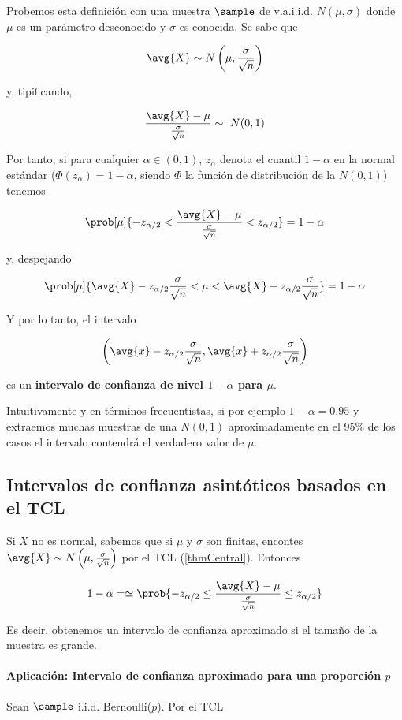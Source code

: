 \documentclass{apuntes}
\begin{document}
Probemos esta definición con una muestra $\sample$ de v.a.i.i.d. $N(\mu,\sigma)$ donde $\mu$ es un parámetro desconocido y $\sigma$ es conocida. Se sabe que

\[ \avg{X} \sim N\left(\mu,\frac{\sigma}{\sqrt{n}}\right) \]

y, tipificando,

\[ \frac{\avg{X}-\mu}{\frac{\sigma}{\sqrt{n}}} \sim~ N(0,1) \]

Por tanto, si para cualquier $\alpha\in(0,1)$, $z_\alpha$ denota el cuantil $1-\alpha$ en la normal estándar ($Φ(z_\alpha) = 1-\alpha$, siendo $Φ$ la función de distribución de la $N(0,1)$) tenemos

\[ \prob[\mu]{-z_{\alpha/2} < \frac{\avg{X}-\mu}{\frac{\sigma}{\sqrt{n}}}  < z_{\alpha/2}} = 1-\alpha \]

y, despejando

\[ \prob[\mu]{\avg{X} - z_{\alpha/2}\frac{\sigma}{\sqrt{n}} < \mu < \avg{X} + z_{\alpha/2}\frac{\sigma}{\sqrt{n}}} = 1-\alpha \]

Y por lo tanto, el intervalo

\[ \left(\avg{x} - z_{\alpha/2}\frac{\sigma}{\sqrt{n}}, \avg{x} + z_{\alpha/2}\frac{\sigma}{\sqrt{n}}\right)\]

es un \textbf{intervalo de confianza de nivel $1-\alpha$ para $\mu$}.

Intuitivamente y en términos frecuentistas, si por ejemplo $1-\alpha = 0.95$ y extraemos muchas muestras de una $N(0,1)$ aproximadamente en el 95\% de los casos el intervalo contendrá el verdadero valor de $\mu$.

\subsection{Intervalos de confianza asintóticos basados en el TCL}

Si $X$ no es normal, sabemos que si $\mu$ y $\sigma$ son finitas, encontes $\avg{X} \sim N\left(\mu,\frac{\sigma}{\sqrt{n}}\right)$ por el TCL (\ref{thmCentral}). Entonces

\[ 1-\alpha = \simeq \prob{-z_{\alpha/2} \leq \frac{\avg{X} - \mu}{\frac{\sigma}{\sqrt{n}}} \leq z_{\alpha/2}} \]

Es decir, obtenemos un intervalo de confianza aproximado si el tamaño de la muestra es grande.

\paragraph{Aplicación: Intervalo de confianza aproximado para una proporción $p$} Sean $\sample$ i.i.d. Bernoulli($p$). Por el TCL
\end{document}
